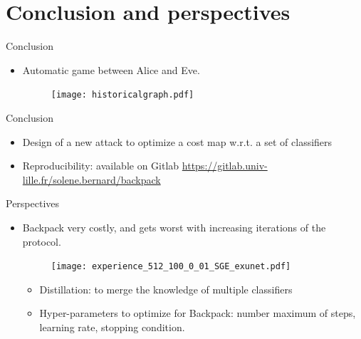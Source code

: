 \documentclass[10pt,aspectratio=169]{beamer}
\begin{document}
\section{Conclusion and perspectives}


\begin{frame}{Conclusion}
    \begin{itemize}
        \item Automatic game between Alice and Eve. 
        \begin{figure}[h]
            \texttt{[image: historicalgraph.pdf]}
        \end{figure}
    \end{itemize}
\end{frame}

\begin{frame}{Conclusion}
    \begin{itemize}
        \setlength\itemsep{2em}
        \item Design of a new attack to optimize a cost map w.r.t. a set of classifiers
        \pause
        \item Reproducibility: available on Gitlab \url{https://gitlab.univ-lille.fr/solene.bernard/backpack}
    \end{itemize}
\end{frame}


\begin{frame}{Perspectives}

    \begin{itemize}

        \item Backpack very costly, and gets worst with increasing iterations of the protocol. 
        
        \begin{figure}[h]
            \texttt{[image: experience\_512\_100\_0\_01\_SGE\_exunet.pdf]}
        \end{figure}

        \pause

        \begin{itemize}
            \item Distillation: to merge the knowledge of multiple classifiers
            \item Hyper-parameters to optimize for Backpack: number maximum of steps, learning rate, stopping condition.
        \end{itemize}

    \end{itemize}

\end{frame}
\end{document}

